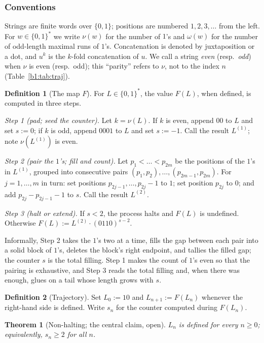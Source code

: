 \documentclass[a4paper]{article}
\theoremstyle{plain}
\newtheorem{thm}[theorem]{Theorem}
\theoremstyle{definition}
\newtheorem{definition}{Definition}[subsection]
\theoremstyle{remark}
\begin{document}
\subsubsection*{Conventions} Strings are finite words over $\{0,1\}$; positions are numbered $1,2,3,\dots$ from the left. For $w\in\{0,1\}^*$ we write $\nu(w)$ for the number of $1$'s and $\omega(w)$ for the number of odd-length maximal runs of $1$'s. Concatenation is denoted by juxtaposition or a dot, and $u^k$ is the $k$-fold concatenation of $u$. We call a string \emph{even} (resp.\ \emph{odd}) when $\nu$ is even (resp.\ odd); this ``parity'' refers to $\nu$, not to the index $n$ (Table~\ref{b1:tab:traj}).

\begin{definition}[The map $F$]\label{b1:def:F}
For $L\in\{0,1\}^*$, the value $F(L)$, when defined, is computed in three steps.

\emph{Step 1 (pad; seed the counter).} Let $k=\nu(L)$. If $k$ is even, append $00$ to $L$ and set $s:=0$; if $k$ is odd, append $0001$ to $L$ and set $s:=-1$. Call the result $L^{(1)}$; note $\nu(L^{(1)})$ is even.

\emph{Step 2 (pair the $1$'s; fill and count).} Let $p_1<\dots<p_{2m}$ be the positions of the $1$'s in $L^{(1)}$, grouped into consecutive pairs $(p_1,p_2),\dots,(p_{2m-1},p_{2m})$. For $j=1,\dots,m$ in turn: set positions $p_{2j-1},\dots,p_{2j}-1$ to $1$; set position $p_{2j}$ to $0$; and add $p_{2j}-p_{2j-1}-1$ to $s$. Call the result $L^{(2)}$.

\emph{Step 3 (halt or extend).} If $s<2$, the process halts and $F(L)$ is undefined. Otherwise $F(L):=L^{(2)}\cdot(0110)^{s-2}$.
\end{definition}

Informally, Step 2 takes the $1$'s two at a time, fills the gap between each pair into a solid block of $1$'s, deletes the block's right endpoint, and tallies the filled gap; the counter $s$ is the total filling. Step 1 makes the count of $1$'s even so that the pairing is exhaustive, and Step 3 reads the total filling and, when there was enough, glues on a tail whose length grows with $s$.

\begin{definition}[Trajectory]\label{b1:def:traj}
Set $L_0:=10$ and $L_{n+1}:=F(L_n)$ whenever the right-hand side is defined. Write $s_n$ for the counter computed during $F(L_n)$.
\end{definition}

\begin{thm}[Non-halting; the central claim, open]\label{b1:thm:central}
$L_n$ is defined for every $n\ge 0$; equivalently, $s_n\ge 2$ for all $n$.
\end{thm}
\end{document}
